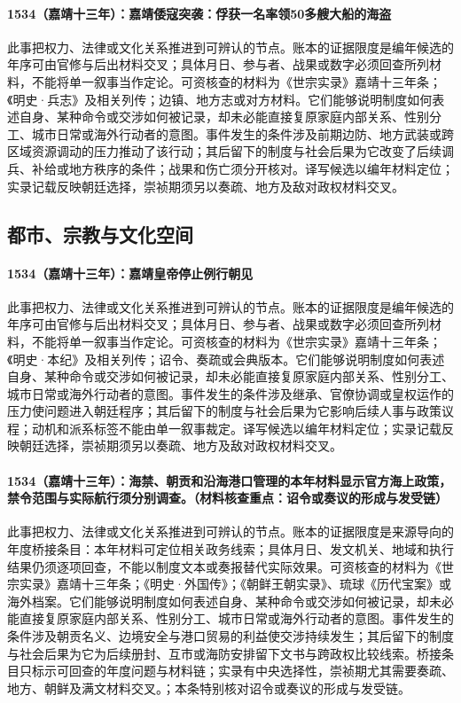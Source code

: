 \paragraph{1534（嘉靖十三年）：嘉靖倭寇突袭：俘获一名率领50多艘大船的海盗} 此事把权力、法律或文化关系推进到可辨认的节点。账本的证据限度是编年候选的年序可由官修与后出材料交叉；具体月日、参与者、战果或数字必须回查所列材料，不能将单一叙事当作定论。可资核查的材料为《世宗实录》嘉靖十三年条；《明史·兵志》及相关列传；边镇、地方志或对方材料。它们能够说明制度如何表述自身、某种命令或交涉如何被记录，却未必能直接复原家庭内部关系、性别分工、城市日常或海外行动者的意图。事件发生的条件涉及前期边防、地方武装或跨区域资源调动的压力推动了该行动；其后留下的制度与社会后果为它改变了后续调兵、补给或地方秩序的条件；战果和伤亡须分开核对。译写候选以编年材料定位；实录记载反映朝廷选择，崇祯期须另以奏疏、地方及敌对政权材料交叉。

\subsection{都市、宗教与文化空间}

\paragraph{1534（嘉靖十三年）：嘉靖皇帝停止例行朝见} 此事把权力、法律或文化关系推进到可辨认的节点。账本的证据限度是编年候选的年序可由官修与后出材料交叉；具体月日、参与者、战果或数字必须回查所列材料，不能将单一叙事当作定论。可资核查的材料为《世宗实录》嘉靖十三年条；《明史·本纪》及相关列传；诏令、奏疏或会典版本。它们能够说明制度如何表述自身、某种命令或交涉如何被记录，却未必能直接复原家庭内部关系、性别分工、城市日常或海外行动者的意图。事件发生的条件涉及继承、官僚协调或皇权运作的压力使问题进入朝廷程序；其后留下的制度与社会后果为它影响后续人事与政策议程；动机和派系标签不能由单一叙事裁定。译写候选以编年材料定位；实录记载反映朝廷选择，崇祯期须另以奏疏、地方及敌对政权材料交叉。

\paragraph{1534（嘉靖十三年）：海禁、朝贡和沿海港口管理的本年材料显示官方海上政策，禁令范围与实际航行须分别调查。（材料核查重点：诏令或奏议的形成与发受链）} 此事把权力、法律或文化关系推进到可辨认的节点。账本的证据限度是来源导向的年度桥接条目：本年材料可定位相关政务线索；具体月日、发文机关、地域和执行结果仍须逐项回查，不能以制度文本或奏报替代实际效果。可资核查的材料为《世宗实录》嘉靖十三年条；《明史·外国传》；《朝鲜王朝实录》、琉球《历代宝案》或海外档案。它们能够说明制度如何表述自身、某种命令或交涉如何被记录，却未必能直接复原家庭内部关系、性别分工、城市日常或海外行动者的意图。事件发生的条件涉及朝贡名义、边境安全与港口贸易的利益使交涉持续发生；其后留下的制度与社会后果为它为后续册封、互市或海防安排留下文书与跨政权比较线索。桥接条目只标示可回查的年度问题与材料链；实录有中央选择性，崇祯期尤其需要奏疏、地方、朝鲜及满文材料交叉。；本条特别核对诏令或奏议的形成与发受链。

